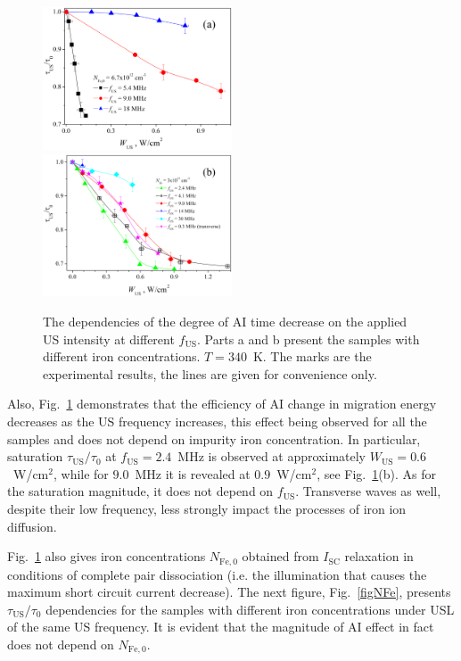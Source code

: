 \documentclass[sn-mathphys]{sn-jnl}%
\theoremstyle{thmstyleone}%
\theoremstyle{thmstyletwo}%
\theoremstyle{thmstylethree}%
\begin{document}
\begin{figure}
\centering
 \includegraphics[width=0.5\textwidth]{Fig4a}
 \includegraphics[width=0.5\textwidth]{Fig4b}
\caption{
The dependencies of the degree of AI time decrease on the applied US intensity at different $f_\mathrm{US}$.
Parts a and b present the samples with different iron concentrations.
$T=340$~K.
The marks are the experimental results, the lines are given for convenience only.
}
\label{figfus}       %
\end{figure}

Also, Fig.~\ref{figfus} demonstrates that the efficiency of
AI change in migration energy decreases as the US frequency increases,
this effect being observed for all the samples and does not depend on impurity iron concentration.
In particular, saturation $\tau_\mathrm{US}/\tau_{0}$ at $f_\mathrm{US}=2.4$~MHz is observed
at approximately $W_\mathrm{US}=0.6$~W/cm$^2$,
while for $9.0$~MHz it is revealed at $0.9$~W/cm$^2$, see Fig.~\ref{figfus}(b).
As for the saturation magnitude, it does not depend on $f_\mathrm{US}$.
Transverse waves as well, despite their low frequency, less strongly impact the processes of iron ion diffusion.

Fig.~\ref{figfus} also gives iron concentrations $N_\mathrm{Fe,0}$ obtained from $I_\mathrm{SC}$ relaxation
in conditions of complete pair dissociation (i.e. the illumination that causes the maximum short circuit current decrease).
The next figure, Fig.~\ref{figNFe}, presents $\tau_\mathrm{US}/\tau_{0}$  dependencies
for the samples with different iron concentrations under USL of the same US frequency.
It is evident that the magnitude of AI effect in fact does not depend on $N_\mathrm{Fe,0}$.
\end{document}
